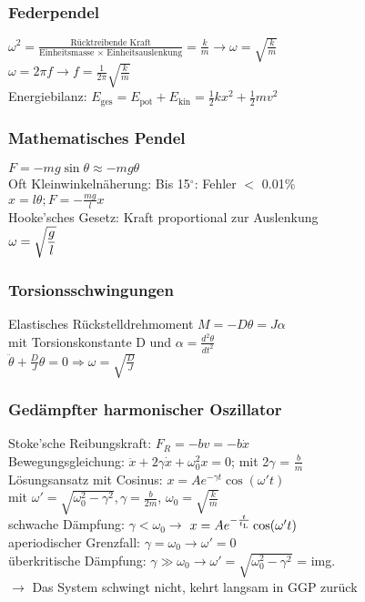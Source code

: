 \documentclass[fs, footer]{latex4ei}
\begin{document}
\begin{multicols*}{4}
\subsubsection{Federpendel}
$\omega ^2 = \frac{\text{Rücktreibende Kraft}}{\text{Einheitsmasse $\times$ Einheitsauslenkung}} = \frac{k}{m} \rightarrow \omega = \sqrt{\frac{k}{m}}$\\
$\omega= 2 \pi f \rightarrow f = \frac{1}{2\pi}\sqrt{\frac{k}{m}}$\\
Energiebilanz: $E_{\text{ges}} = E_{\text{pot}} + E_{\text{kin}} = \frac{1}{2}kx^2+\frac{1}{2}mv^2$\\
\subsubsection{Mathematisches Pendel} 
$F = -mg \sin \theta \approx -mg \theta$\\
Oft Kleinwinkelnäherung: Bis 15$^{\circ}$: Fehler $<$ 0.01\%\\ %
$x = l\theta ; F=-\frac{mg}{l}x$\\
Hooke'sches Gesetz: Kraft proportional zur Auslenkung\\
$\omega = \sqrt{\dfrac{g}{l}}$
\subsubsection{Torsionsschwingungen}
Elastisches Rückstelldrehmoment $M = -D\theta = J\alpha$\\
mit Torsionskonstante D und $\alpha = \frac{d^2 \theta}{dt^2}$\\
$\ddot{\theta}+\frac{D}{J}\theta = 0 \Rightarrow \omega = \sqrt{\frac{D}{J}}$\\
\subsubsection{Gedämpfter harmonischer Oszillator}
Stoke'sche Reibungskraft: $F_R = -bv = -b\dot{x}$\\
Bewegungsgleichung: $\ddot{x} + 2\gamma \dot{x} + \omega_0^2x = 0$; mit 2$\gamma$ = $\frac{b}{m}$\\
Lösungsansatz mit Cosinus: $x = Ae^{-\gamma t} \cos(\omega 't)$ \\mit $\omega ' = \sqrt{\omega_0^2-\gamma^2}, \gamma = \frac{b}{2m}$, $\omega_0 = \sqrt{\frac{k}{m}}$\\
schwache Dämpfung: $\gamma < \omega_0 \rightarrow$ $x = Ae^{- \frac{t}{t_{\text{\tiny L}}}} \cos(\omega 't)$\\
aperiodischer Grenzfall: $\gamma = \omega_0 \rightarrow	\omega' = 0$\\
überkritische Dämpfung: $\gamma \gg \omega_0 \rightarrow \omega' = \sqrt{\omega_0^2 - \gamma^2}$ = img.\\ $\rightarrow$ Das System schwingt nicht, kehrt langsam in GGP zurück\\


\end{multicols*}
\end{document}
